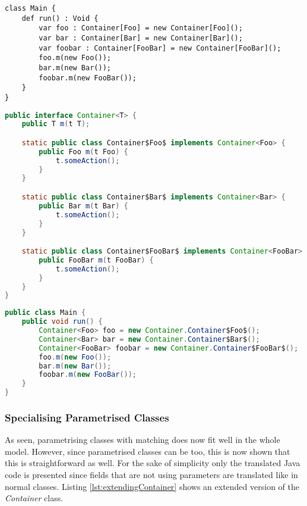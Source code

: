 \begin{lstlisting}[float,language=ooplss,caption=Valid use of a match-bound container,label=lst:useParametrisationOoplss]
class Main {
	def run() : Void {
		var foo : Container[Foo] = new Container[Foo]();
		var bar : Container[Bar] = new Container[Bar]();
		var foobar : Container[FooBar] = new Container[FooBar]();
		foo.m(new Foo());
		bar.m(new Bar());
		foobar.m(new FooBar());
	}
}
\end{lstlisting}

\begin{lstlisting}[float,language=java,caption=Container class translated to Java,label=lst:parametrisationJava]
public interface Container<T> {
	public T m(t T);

	static public class Container$Foo$ implements Container<Foo> {
		public Foo m(t Foo) {
			t.someAction();
		}
	}

	static public class Container$Bar$ implements Container<Bar> {
		public Bar m(t Bar) {
			t.someAction();
		}
	}

	static public class Container$FooBar$ implements Container<FooBar> {
		public FooBar m(t FooBar) {
			t.someAction();
		}
	}
}
\end{lstlisting}

\begin{lstlisting}[float,language=java,caption=Use of parametised classes in Java,label=lst:useParametrisationJava]
public class Main {
	public void run() {
		Container<Foo> foo = new Container.Container$Foo$();
		Container<Bar> bar = new Container.Container$Bar$();
		Container<FooBar> foobar = new Container.Container$FooBar$();
		foo.m(new Foo());
		bar.m(new Bar());
		foobar.m(new FooBar());
	}
}
\end{lstlisting}

\subsubsection{Specialising Parametrised Classes}
As seen, parametrising classes with matching does now fit well in
the whole model. However, since parametrised classes can be too,
this is now shown that this is straightforward as well. For the
sake of simplicity only the translated Java code is presented since
fields that are not using parameters are translated like in normal
classes. Listing \ref{lst:extendingContainer} shows an extended version
of the \emph{Container} class.

